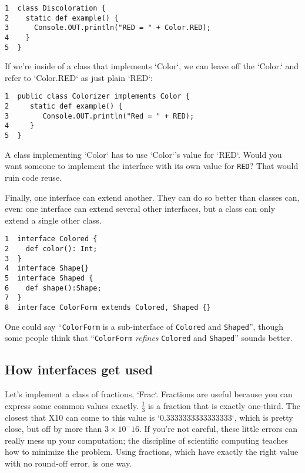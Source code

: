 \begin{description}
\begin{verbatim}
1  class Discoloration {
2    static def example() {
3      Console.OUT.println("RED = " + Color.RED);
4    }
5  }
\end{verbatim}

If we're inside of a class that implements \xcd`Color`, we can leave off the
\xcd`Color.` and refer to \xcd`Color.RED` as just plain \xcd`RED`:

\begin{verbatim}
1  public class Colorizer implements Color {
2     static def example() {
3        Console.OUT.println("Red = " + RED); 
4     }
5  }
\end{verbatim}

A class implementing \xcd`Color` has to use \xcd`Color`'s value for \xcd`RED`.  
Would you 
want someone to implement the interface with its own value for {\tt RED}? That
would ruin code reuse. 


\end{description}

Finally, one interface can extend another. They can do so better than classes
can, even: one interface can extend several other interfaces, but a class can
only extend a single other class. 

\begin{verbatim}
1  interface Colored {
2    def color(): Int;
3  }
4  interface Shape{}
5  interface Shaped {
6    def shape():Shape;
7  }
8  interface ColorForm extends Colored, Shaped {}
\end{verbatim}


One could
say ``{\tt ColorForm} is a sub-interface of {\tt Colored} and {\tt Shaped}'', though some
people think that 
``{\tt ColorForm} {\em refines} {\tt Colored} and {\tt Shaped}'' sounds better. 

\subsection{How interfaces get used}

Let's implement a class of fractions, \xcd`Frac`.  Fractions are useful
because you can express some common values exactly.  {$\frac{1}{3}$} is a
fraction that is exactly one-third.  The 
closest that X10 can come to this value is 
\xcd`0.3333333333333333`, which is pretty close, but off by more than
{$3\times 10^-16$}.  If you're not careful, these little errors can really
mess up your computation; the discipline of scientific computing teaches how
to minimize the problem.  Using fractions, which have exactly the right value
with no round-off error, is one way.

